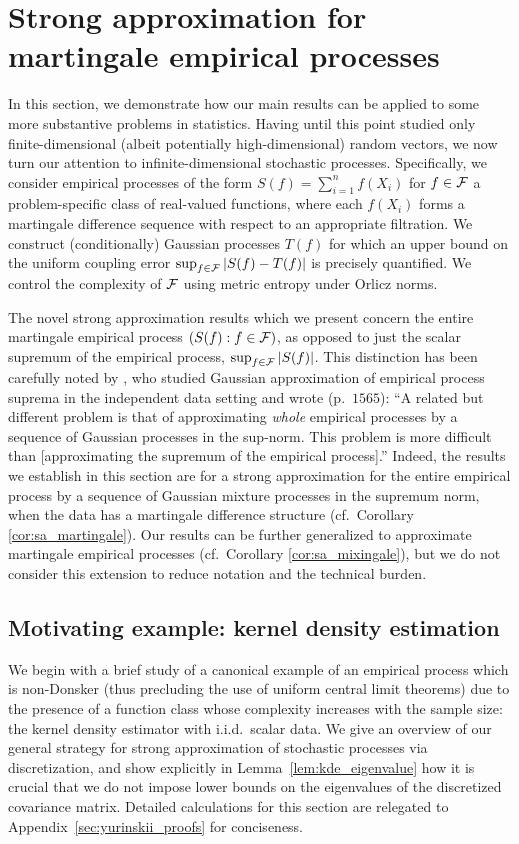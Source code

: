 \section{Strong approximation for martingale empirical processes}%
\label{sec:emp_proc}

In this section, we demonstrate how our main results can be applied to some more
substantive problems in statistics. Having until this point studied only
finite-dimensional (albeit potentially high-dimensional) random vectors, we now
turn our attention to infinite-dimensional stochastic processes. Specifically,
we consider empirical processes of the form
$S(f) = \sum_{i=1}^{n} f(X_i)$ for $f \in \mathcal{F}$
a problem-specific class of real-valued
functions, where each $f(X_i)$ forms a martingale difference sequence with
respect to an appropriate filtration. We construct (conditionally) Gaussian
processes $T(f)$ for which an upper bound on the uniform coupling error
$\sup_{f \in \mathcal{F}} |S(f) - T(f)|$ is precisely quantified. We control the
complexity of $\mathcal{F}$ using metric entropy under Orlicz norms.

The novel strong approximation results which we present concern the entire
martingale empirical process $(S(f):f \in \mathcal{F})$, as opposed to just the scalar
supremum of the empirical process, $\sup_{f \in \mathcal{F}} |S(f)|$. This distinction
has been carefully noted by \citet{chernozhukov2014gaussian}, who studied
Gaussian approximation of empirical process suprema in the independent data
setting and wrote (p.\ $1565$): ``A related but different problem is that of
approximating \textit{whole} empirical processes by a sequence of Gaussian
processes in the sup-norm. This problem is more difficult than
[approximating the supremum of the empirical process].''
Indeed, the results we establish in
this section are for a strong approximation for the entire empirical process by
a sequence of Gaussian mixture processes in the supremum norm, when the data
has a martingale difference structure (cf.\ Corollary \ref{cor:sa_martingale}).
Our results can be further generalized to approximate martingale
empirical processes (cf.\ Corollary \ref{cor:sa_mixingale}), but we do not
consider this extension to reduce notation and the technical burden.

\subsection{Motivating example: kernel density estimation}
\label{sec:kde}

We begin with a brief study of a canonical example of an empirical process
which is non-Donsker (thus precluding the use of uniform central limit
theorems) due to the presence of a function class whose complexity increases
with the sample size: the kernel density estimator with i.i.d.\ scalar data.
We give an overview of our general strategy for
strong approximation of stochastic processes
via discretization, and show explicitly in Lemma~\ref{lem:kde_eigenvalue}
how it is crucial
that we do not impose lower bounds on the eigenvalues of the discretized
covariance matrix. Detailed calculations for this section are
relegated to Appendix~\ref{sec:yurinskii_proofs} for conciseness.


